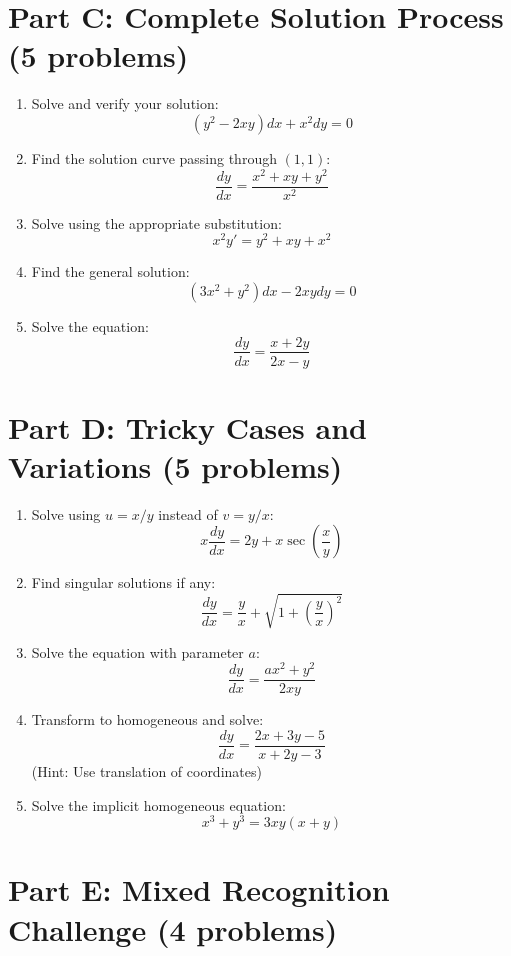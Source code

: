 \documentclass[12pt]{article}
\begin{document}
\section*{Part C: Complete Solution Process (5 problems)}

\begin{enumerate}[resume]
    \item Solve and verify your solution:
    $$\left(y^2 - 2xy\right)dx + x^2 dy = 0$$

    \item Find the solution curve passing through $(1, 1)$:
    $$\frac{dy}{dx} = \frac{x^2 + xy + y^2}{x^2}$$

    \item Solve using the appropriate substitution:
    $$x^2y' = y^2 + xy + x^2$$

    \item Find the general solution:
    $$(3x^2 + y^2)dx - 2xy dy = 0$$

    \item Solve the equation:
    $$\frac{dy}{dx} = \frac{x + 2y}{2x - y}$$
\end{enumerate}

\section*{Part D: Tricky Cases and Variations (5 problems)}

\begin{enumerate}[resume]
    \item Solve using $u = x/y$ instead of $v = y/x$:
    $$x\frac{dy}{dx} = 2y + x\sec\left(\frac{x}{y}\right)$$

    \item Find singular solutions if any:
    $$\frac{dy}{dx} = \frac{y}{x} + \sqrt{1 + \left(\frac{y}{x}\right)^2}$$

    \item Solve the equation with parameter $a$:
    $$\frac{dy}{dx} = \frac{ax^2 + y^2}{2xy}$$

    \item Transform to homogeneous and solve:
    $$\frac{dy}{dx} = \frac{2x + 3y - 5}{x + 2y - 3}$$
    (Hint: Use translation of coordinates)

    \item Solve the implicit homogeneous equation:
    $$x^3 + y^3 = 3xy(x + y)$$
\end{enumerate}

\section*{Part E: Mixed Recognition Challenge (4 problems)}
\end{document}
